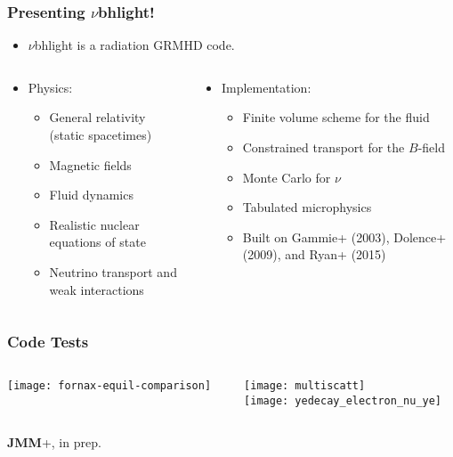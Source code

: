 \documentclass[]{beamer}
\begin{document}
\begin{frame}
  \frametitle{Presenting $\nu$bhlight!}
  \begin{itemize}
  \item $\nu$bhlight is a radiation GRMHD code.
  \end{itemize}
  \begin{columns}
    \begin{column}{6cm}
      \begin{itemize}
      \item Physics:
        \begin{itemize}
        \item General relativity (static spacetimes)
        \item Magnetic fields
        \item Fluid dynamics
        \item Realistic nuclear equations of state
        \item Neutrino transport and weak interactions
        \end{itemize}
      \end{itemize}
    \end{column}
    \begin{column}{6cm}
      \begin{itemize}
      \item Implementation:
        \begin{itemize}
        \item Finite volume scheme for the fluid
        \item Constrained transport for the $B$-field
        \item Monte Carlo for $\nu$
        \item Tabulated microphysics
        \item Built on Gammie+ (2003), Dolence+ (2009),  and Ryan+  (2015)
        \end{itemize}
      \end{itemize}
    \end{column}
  \end{columns}
\end{frame}

\begin{frame}
  \frametitle{Code Tests}
  \begin{columns}
    \begin{column}{6cm}
      \centering
      \texttt{[image: fornax-equil-comparison]}
    \end{column}
    \begin{column}{6cm}
      \centering
      \texttt{[image: multiscatt]}\\
      \texttt{[image: yedecay\_electron\_nu\_ye]}
    \end{column}
  \end{columns}
  \textbf{JMM}+, in prep.
\end{frame}
\end{document}
